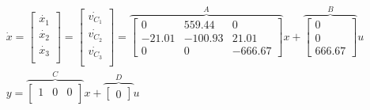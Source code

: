 	\begin{eqnarray}
		\nonumber
		\dot{x} = 
		\begin{bmatrix}
			\dot{x_1} \\
			\dot{x_2} \\
			\dot{x_3} \\
		\end{bmatrix} = 
		\begin{bmatrix}
			\dot{v_{C_1}} \\
			\dot{v_{C_2}} \\
			\dot{v_{C_3}} \\
		\end{bmatrix} =
		\overbrace{
			\begin{bmatrix}
				0 & 559.44 & 0 \\
				-21.01 & -100.93 & 21.01 \\
				0 & 0 & -666.67
		\end{bmatrix}}^{A} x
		+
		\overbrace{
			\begin{bmatrix}
				0 \\
				0 \\
				666.67
		\end{bmatrix}}^{B} u \\
		\label{eq-ssplanta_final}
		y = 
		\overbrace{
			\begin{bmatrix}
				1 & 0 & 0 \\
		\end{bmatrix}}^{C} x
		+
		\overbrace{
			\begin{bmatrix}
				0
		\end{bmatrix}}^{D} u
	\end{eqnarray}
